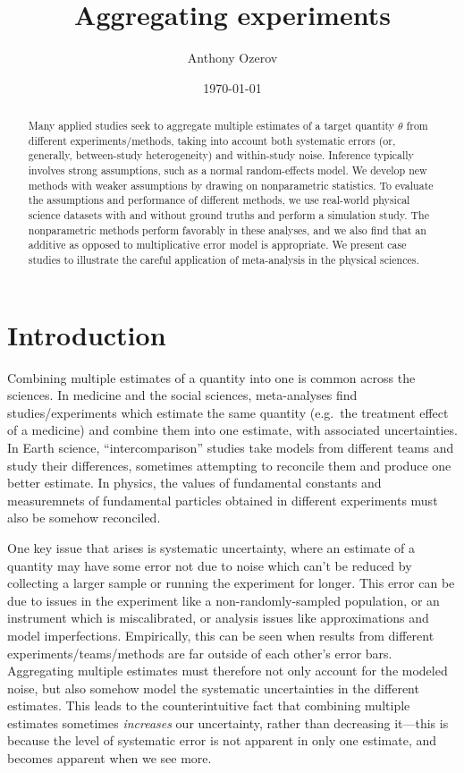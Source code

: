\documentclass[letterpaper,12pt]{article}
\title{Aggregating experiments}
\author{Anthony Ozerov}
\date{\today}
\begin{document}
\maketitle

\begin{abstract}
\noindent Many applied studies seek to aggregate multiple estimates of a target quantity $\theta$ from different experiments/methods, taking into account both systematic errors (or, generally, between-study heterogeneity) and within-study noise. Inference typically involves strong assumptions, such as a normal random-effects model. We develop new methods with weaker assumptions by drawing on nonparametric statistics. To evaluate the assumptions and performance of different methods, we use real-world physical science datasets with and without ground truths and perform a simulation study. The nonparametric methods perform favorably in these analyses, and we also find that an additive as opposed to multiplicative error model is appropriate. We present case studies to illustrate the careful application of meta-analysis in the physical sciences.
\end{abstract}

\newpage

\tableofcontents

\newpage

\section{Introduction}\label{introduction}

Combining multiple estimates of a quantity into one is common across the sciences. In medicine and the social sciences, meta-analyses find studies/experiments which estimate the same quantity (e.g.~the treatment effect of a medicine) and combine them into one estimate, with associated uncertainties. In Earth science, ``intercomparison'' studies take models from different teams and study their differences, sometimes attempting to reconcile them and produce one better estimate. In physics, the values of fundamental constants and measuremnets of fundamental particles obtained in different experiments must also be somehow reconciled.

One key issue that arises is systematic uncertainty, where an estimate of a quantity may have some error not due to noise which can't be reduced by collecting a larger sample or running the experiment for longer. This error can be due to issues in the experiment like a non-randomly-sampled population, or an instrument which is miscalibrated, or analysis issues like approximations and model imperfections. Empirically, this can be seen when results from different experiments/teams/methods are far outside of each other's error bars. Aggregating multiple estimates must therefore not only account for the modeled noise, but also somehow model the systematic uncertainties in the different estimates. This leads to the counterintuitive fact that combining multiple estimates sometimes \emph{increases} our uncertainty, rather than decreasing it---this is because the level of systematic error is not apparent in only one estimate, and becomes apparent when we see more.
\end{document}
